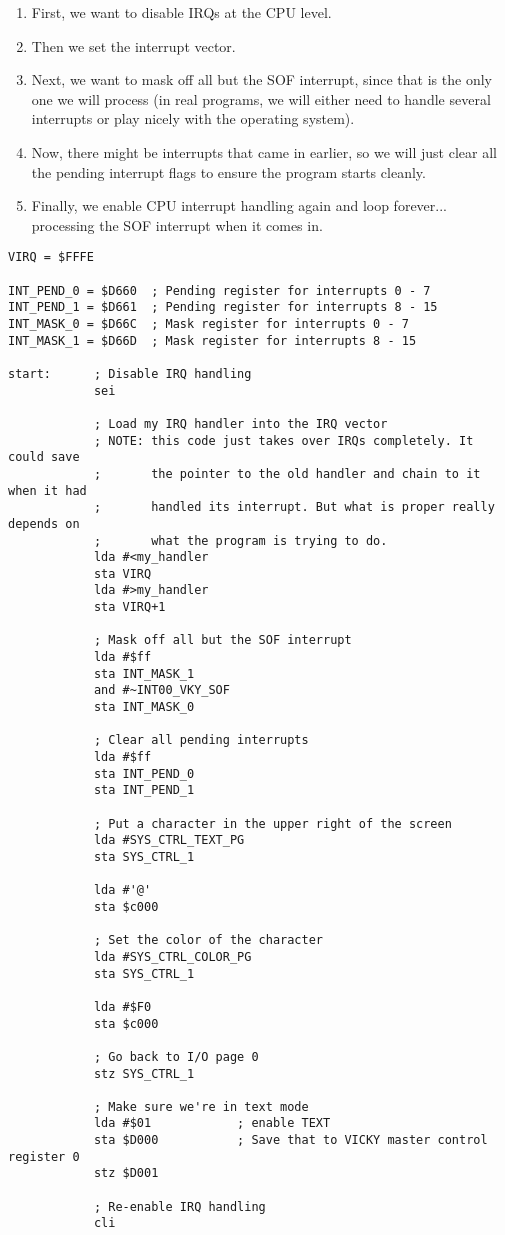 \begin{enumerate}
    \item First, we want to disable IRQs at the CPU level.
    \item Then we set the interrupt vector.
    \item Next, we want to mask off all but the SOF interrupt, since that is the only one we will process (in real programs, we will either need to handle several interrupts or play nicely with the operating system).
    \item Now, there might be interrupts that came in earlier, so we will just clear all the pending interrupt flags to ensure the program starts cleanly.
    \item Finally, we enable CPU interrupt handling again and loop forever... processing the SOF interrupt when it comes in.
\end{enumerate}

\begin{verbatim}
VIRQ = $FFFE

INT_PEND_0 = $D660  ; Pending register for interrupts 0 - 7
INT_PEND_1 = $D661  ; Pending register for interrupts 8 - 15
INT_MASK_0 = $D66C  ; Mask register for interrupts 0 - 7
INT_MASK_1 = $D66D  ; Mask register for interrupts 8 - 15

start:      ; Disable IRQ handling
            sei

            ; Load my IRQ handler into the IRQ vector
            ; NOTE: this code just takes over IRQs completely. It could save
            ;       the pointer to the old handler and chain to it when it had
            ;       handled its interrupt. But what is proper really depends on
            ;       what the program is trying to do.
            lda #<my_handler
            sta VIRQ
            lda #>my_handler
            sta VIRQ+1

            ; Mask off all but the SOF interrupt
            lda #$ff
            sta INT_MASK_1
            and #~INT00_VKY_SOF
            sta INT_MASK_0

            ; Clear all pending interrupts
            lda #$ff
            sta INT_PEND_0
            sta INT_PEND_1

            ; Put a character in the upper right of the screen
            lda #SYS_CTRL_TEXT_PG
            sta SYS_CTRL_1

            lda #'@'
            sta $c000

            ; Set the color of the character
            lda #SYS_CTRL_COLOR_PG
            sta SYS_CTRL_1

            lda #$F0
            sta $c000

            ; Go back to I/O page 0
            stz SYS_CTRL_1

            ; Make sure we're in text mode
            lda #$01            ; enable TEXT
            sta $D000           ; Save that to VICKY master control register 0
            stz $D001

            ; Re-enable IRQ handling
            cli
\end{verbatim}

